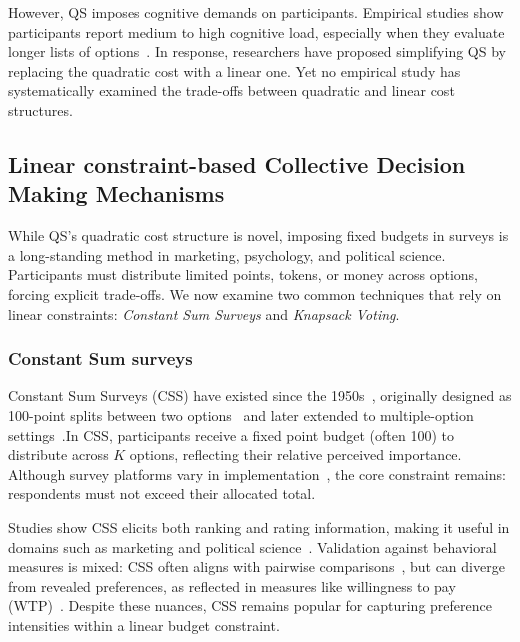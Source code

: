 However, QS imposes cognitive demands on participants. Empirical studies show participants report medium to high cognitive load, especially when they evaluate longer lists of options~\cite{cavaille2024cares, chengOrganizeThenVote2025}. In response, researchers have proposed simplifying QS by replacing the quadratic cost with a linear one. Yet no empirical study has systematically examined the trade-offs between quadratic and linear cost structures.

\subsection{Linear constraint-based Collective Decision Making Mechanisms}
\label{sec:related_works_force_choice}
While QS's quadratic cost structure is novel, imposing fixed budgets in surveys is a long-standing method in marketing, psychology, and political science. Participants must distribute limited points, tokens, or money across options, forcing explicit trade-offs. We now examine two common techniques that rely on linear constraints: \textit{Constant Sum Surveys} and \textit{Knapsack Voting}.

\subsubsection{Constant Sum surveys}
Constant Sum Surveys (CSS) have existed since the 1950s~\cite{Malhotra_Naresh_K_2012, smithBasicMarketingResearch2013, Donald_R_Cooper2013-03-05}, originally designed as 100-point splits between two options~\cite{metfesselProposalQuantitativeReporting1947} and later extended to multiple-option settings~\cite{zhuSelfestimationWeightParameter1991, harwoodUnderstandingImplicitExplicit2019}.In CSS, participants receive a fixed point budget (often 100) to distribute across $K$ options, reflecting their relative perceived importance. Although survey platforms vary in implementation~\cite{qualtricsConstantSumQuestion2025, surveysparrowWhatConstantSum2025, lorraineConstantSumQuestion2022}, the core constraint remains: respondents must not exceed their allocated total.

Studies show CSS elicits both ranking and rating information, making it useful in domains such as marketing and political science~\cite{collewetPreferenceEstimationPoint2023}. Validation against behavioral measures is mixed: CSS often aligns with pairwise comparisons~\cite{dudekValidityPointAssignmentProcedure1957}, but can diverge from revealed preferences, as reflected in measures like willingness to pay (WTP)~\cite{louviereComparisonImportanceWeights2008}. Despite these nuances, CSS remains popular for capturing preference intensities within a linear budget constraint.

